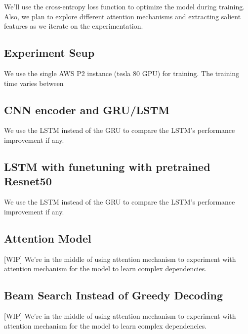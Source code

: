 \documentclass{article}
\begin{document}

We'll use the cross-entropy loss function to optimize the model during training. Also, we plan to explore different attention mechanisms and extracting salient features as we iterate on the experimentation.

\subsection{Experiment Seup}
We use the single AWS P2 instance (tesla 80 GPU) for training. The training time varies between  

\subsection{CNN encoder and GRU/LSTM}
We use the LSTM instead of the GRU to compare the LSTM's performance improvement if any.

\subsection{LSTM with funetuning with pretrained Resnet50}
We use the LSTM instead of the GRU to compare the LSTM's performance improvement if any.

\subsection{Attention Model}
  [WIP] We're in the middle of using attention mechanism to experiment with attention mechanism for the model to learn complex dependencies.
  
\subsection{Beam Search Instead of Greedy Decoding}
  [WIP] We're in the middle of using attention mechanism to experiment with attention mechanism for the model to learn complex dependencies. 
\end{document}
